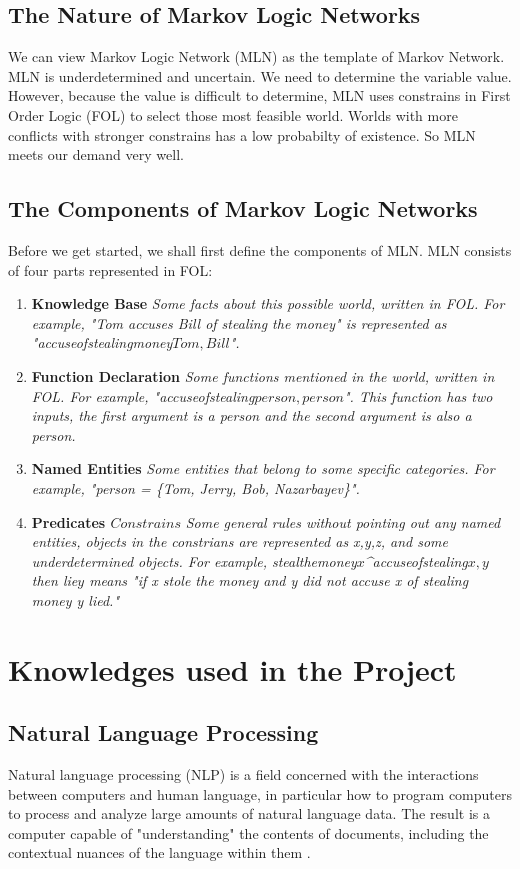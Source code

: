 \documentclass[
12pt, %
a4paper, %
oneside, %
headinclude,footinclude, %
BCOR5mm, %
]{scrartcl}
\begin{document}
\subsection{The Nature of Markov Logic Networks}
We can view Markov Logic Network (MLN) as the template of Markov Network. MLN is underdetermined and uncertain. We need to determine the variable value. However, because the value is difficult to determine, MLN uses constrains in First Order Logic (FOL) to select those most feasible world. Worlds with more conflicts with  stronger constrains has a low probabilty of existence. So MLN meets our demand very well.


\subsection{The Components of Markov Logic Networks}
Before we get started, we shall first define the components of MLN. MLN consists of four parts represented in FOL:
\begin{enumerate}[noitemsep]
    \item \textbf{Knowledge Base} \textit{Some facts about this possible world, written in FOL. For example, "Tom accuses Bill of stealing the money" is represented as "accuseofstealingmoney\(Tom,Bill\)".}
    \item \textbf{Function Declaration} \textit{Some functions mentioned in the world, written in FOL. For example, "accuseofstealing\(person,person\)". This function has two inputs, the first argument is a person and the second argument is also a person.}
    \item \textbf{Named Entities} \textit{Some entities that belong to some specific categories. For example, "person = \{Tom, Jerry, Bob, Nazarbayev\}".}
    \item \textbf{Predicates \(Constrains\)} \textit{Some general rules without pointing out any named entities, objects in the constrians are represented as x,y,z, and some underdetermined objects. For example, stealthemoney\(x\)\^\!accuseofstealing\(x,y\) then lie\(y\) means "if x stole the money and y did not accuse x of stealing money y lied."}
\end{enumerate}



\section{Knowledges used in the Project}
\subsection{Natural Language Processing}
Natural language processing (NLP) is a field concerned with the interactions between computers and human language, in particular how to program computers to process and analyze large amounts of natural language data. The result is a computer capable of "understanding" the contents of documents, including the contextual nuances of the language within them \cite{enwiki:1020063620}.
\end{document}
